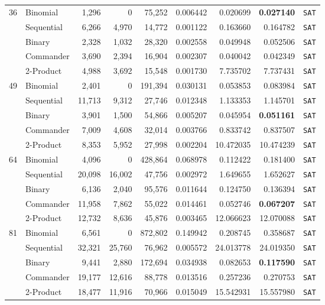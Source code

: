 \documentclass[a4paper,fleqn]{cas-sc}
\begin{document}
\begin{longtable}{r l r r r r r r c}
\multirow{5}{*}{36} 
 & Binomial & 1,296 & 0 & 75,252 & 0.006442 & 0.020699 & \textbf{0.027140} & \texttt{SAT} \\
 & Sequential & 6,266 & 4,970 & 14,772 & 0.001122 & 0.163660 & 0.164782 & \texttt{SAT} \\
 & Binary & 2,328 & 1,032 & 28,320 & 0.002558 & 0.049948 & 0.052506 & \texttt{SAT} \\
 & Commander & 3,690 & 2,394 & 16,904 & 0.002307 & 0.040042 & 0.042349 & \texttt{SAT} \\
 & 2-Product & 4,988 & 3,692 & 15,548 & 0.001730 & 7.735702 & 7.737431 & \texttt{SAT} \\
\midrule
\multirow{5}{*}{49} 
 & Binomial & 2,401 & 0 & 191,394 & 0.030131 & 0.053853 & 0.083984 & \texttt{SAT} \\
 & Sequential & 11,713 & 9,312 & 27,746 & 0.012348 & 1.133353 & 1.145701 & \texttt{SAT} \\
 & Binary & 3,901 & 1,500 & 54,866 & 0.005207 & 0.045954 & \textbf{0.051161} & \texttt{SAT} \\
 & Commander & 7,009 & 4,608 & 32,014 & 0.003766 & 0.833742 & 0.837507 & \texttt{SAT} \\
 & 2-Product & 8,353 & 5,952 & 27,998 & 0.002204 & 10.472035 & 10.474239 & \texttt{SAT} \\
\midrule
\multirow{5}{*}{64} 
 & Binomial & 4,096 & 0 & 428,864 & 0.068978 & 0.112422 & 0.181400 & \texttt{SAT} \\
 & Sequential & 20,098 & 16,002 & 47,756 & 0.002972 & 1.649655 & 1.652627 & \texttt{SAT} \\
 & Binary & 6,136 & 2,040 & 95,576 & 0.011644 & 0.124750 & 0.136394 & \texttt{SAT} \\
 & Commander & 11,958 & 7,862 & 55,022 & 0.014461 & 0.052746 & \textbf{0.067207} & \texttt{SAT} \\
 & 2-Product & 12,732 & 8,636 & 45,876 & 0.003465 & 12.066623 & 12.070088 & \texttt{SAT} \\
\midrule
\multirow{5}{*}{81} 
 & Binomial & 6,561 & 0 & 872,802 & 0.149942 & 0.208745 & 0.358687 & \texttt{SAT} \\
 & Sequential & 32,321 & 25,760 & 76,962 & 0.005572 & 24.013778 & 24.019350 & \texttt{SAT} \\
 & Binary & 9,441 & 2,880 & 172,694 & 0.034938 & 0.082653 & \textbf{0.117590} & \texttt{SAT} \\
 & Commander & 19,177 & 12,616 & 88,778 & 0.013516 & 0.257236 & 0.270753 & \texttt{SAT} \\
 & 2-Product & 18,477 & 11,916 & 70,966 & 0.015049 & 15.542931 & 15.557980 & \texttt{SAT} \\

\end{longtable}
\end{document}
